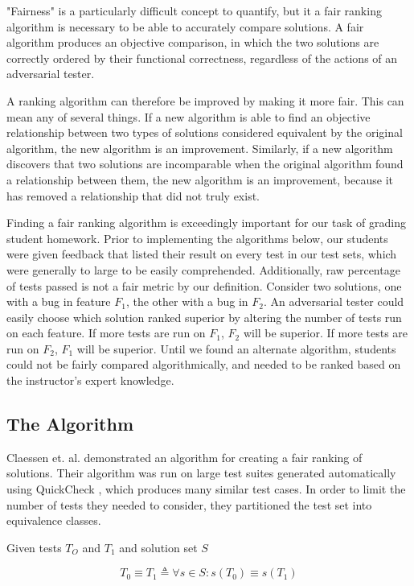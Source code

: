 \documentclass[11pt,twoside]{article}
\newcommand\defined{\triangleq}
\let\cite=\citep
\begin{document}
"Fairness" is a particularly difficult concept to quantify, but it a fair ranking algorithm is necessary to be able to accurately compare solutions. A fair algorithm produces an objective comparison, in which the two solutions are correctly ordered by their functional correctness, regardless of the actions of an adversarial tester.

A ranking algorithm can therefore be improved by making it more fair. This can mean any of several things. If a new algorithm is able to find an objective relationship between two types of solutions considered equivalent by the original algorithm, the new algorithm is an improvement. Similarly, if a new algorithm discovers that two solutions are incomparable when the original algorithm found a relationship between them, the new algorithm is an improvement, because it has removed a relationship that did not truly exist.

Finding a fair ranking algorithm is exceedingly important for our task of grading student homework. Prior to implementing the algorithms below, our students were given feedback that listed their result on every test in our test sets, which were generally to large to be easily comprehended. Additionally, raw percentage of tests passed is not a fair metric by our definition. Consider two solutions, one with a bug in feature $F_1$, the other with a bug in $F_2$. An adversarial tester could easily choose which solution ranked superior by altering the number of tests run on each feature. If more tests are run on $F_1$, $F_2$ will be superior. If more tests are run on $F_2$, $F_1$ will be superior. Until we found an alternate algorithm, students could not be fairly compared algorithmically, and needed to be ranked based on the instructor's expert knowledge.

\subsection{The Algorithm}
Claessen et. al. demonstrated an algorithm for creating a fair ranking of solutions\cite{Claessen}. Their algorithm was run on large test suites generated automatically using QuickCheck \cite{QuickCheck}, which produces many similar test cases. In order to limit the number of tests they needed to consider, they partitioned the test set into equivalence classes.


\centerline{Given tests $T_O$ and $T_1$ and solution set $S$}
$$ T_0 \equiv T_1 \defined \forall s \in S : s(T_0) \equiv s(T_1) $$
\end{document}
